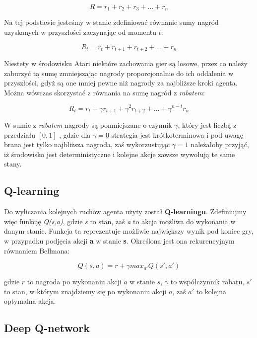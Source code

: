\documentclass[12pt]{article}
\begin{document}
$$R=r_1 + r_2 + r_3 + \dots + r_n$$

Na tej podstawie jesteśmy w stanie zdefiniować równanie sumy nagród uzyskanych w przyszłości zaczynając od momentu $t$:

$$R_t=r_t + r_{t+1}+ r_{t+2} + \dots + r_n$$

Niestety w środowisku Atari niektóre zachowania gier są losowe, przez co należy zaburzyć tą sumę zmniejszając nagrody proporcjonalnie do ich oddalenia w przyszłości, gdyż są one mniej pewne niż nagrody za najbliższe kroki agenta. Można wówczas skorzystać z równania na sumę nagród z \textit{rabatem}:

$$R_t=r_t + \gamma r_{t+1}+  \gamma^2 r_{t+2} + \dots + \gamma^{n-t}r_n$$

W sumie z \textit{rabatem} nagrody są pomniejszane o czynnik $\gamma$, który jest liczbą z przedziału $[0,1]$ , gdzie dla $\gamma =0$ strategia jest krótkoterminowa i pod uwagę brana jest tylko najbliższa nagroda, zaś wykorzustując $\gamma =1$ należałoby przyjąć, iż środowisko jest deterministyczne i kolejne akcje zawsze wywołują te same stany.

\subsection{Q-learning}

Do wyliczania kolejnych ruchów agenta użyty został \textbf{Q-learningu}. Zdefiniujmy więc funkcję \textit{Q(s,a)}, gdzie \textit{s} to stan, zaś \textit{a} to akcja możliwa do wykonania w danym stanie. Funkcja ta reprezentuje możliwie największy wynik pod koniec gry, w przypadku podjęcia akcji \textbf{a} w stanie \textbf{s}. Określona jest ona rekurencyjnym równaniem Bellmana:

$$Q(s,a) =  r + \gamma max_{a'}Q(s',a')$$

gdzie $r$ to nagroda po wykonaniu akcji $a$ w stanie $s$, $\gamma$ to współczynnik rabatu, $s'$ to stan, w którym znajdziemy się po wykonaniu akcji $a$, zaś $a'$ to kolejna optymalna akcja.

\subsection{Deep Q-network}
\end{document}
